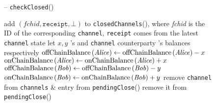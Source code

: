 \begin{figure}[H]
  \begin{systembox}{\fpaynet{} -- \texttt{checkClosed}()}
    \begin{algorithmic}[1]
       
      \label{alg:fpaynet:close:func:start}
        \label{alg:fpaynet:close:func:ifunnotified}
          \State add $(\mathit{fchid}, \mathtt{receipt}, \bot)$ to
          \texttt{closedChannels}(\alice), where \textit{fchid} is the ID of
          the corresponding \texttt{channel}, \texttt{receipt} comes from the
          latest \texttt{channel} state
          \label{alg:fpaynet:close:func:unnotified}
        \EndIf
          \label{alg:fpaynet:close:func:happy:start}
            \State let $x, y$ \alice{}'s and \texttt{channel} counterparty
            \bob{}'s balances respectively
            \State $\mathrm{offChainBalance}\left(\mathit{Alice}\right) \gets
            \mathrm{offChainBalance}\left(\mathit{Alice}\right) - x$
            \State $\mathrm{onChainBalance}\left(\mathit{Alice}\right) \gets
            \mathrm{onChainBalance}\left(\mathit{Alice}\right) + x$
            \label{alg:fpaynet:close:func:alice:credit}
            \State $\mathrm{offChainBalance}\left(\mathit{Bob}\right) \gets
            \mathrm{offChainBalance}\left(\mathit{Bob}\right) - y$
            \State $\mathrm{onChainBalance}\left(\mathit{Bob}\right) \gets
            \mathrm{onChainBalance}\left(\mathit{Bob}\right) + y$
            \label{alg:fpaynet:close:func:bob:credit}
            \State remove \texttt{channel} from \texttt{channels} \& entry
            from \texttt{pendingClose}(\alice)
              \State remove it from \texttt{pendingClose}(\bob)
            \EndIf
            \label{alg:fpaynet:close:func:happy:end}
\end{algorithmic}
\end{systembox}
\end{figure}
